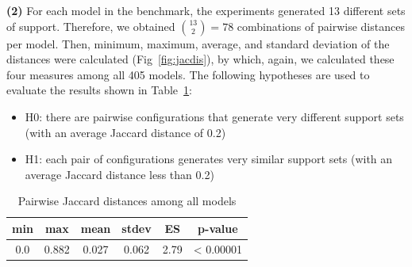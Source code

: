 \vspace{6pt}
\noindent{}
 \vspace{6pt}

\textbf{(2)} For each model in the benchmark, the experiments generated 13 different sets of support. Therefore, we obtained $\binom{13}{2} = 78$ combinations of pairwise distances per model. Then, minimum, maximum, average, and standard deviation of the distances were calculated (Fig~\ref{fig:jacdis}), by which, again, we calculated these four measures among all 405 models. The following hypotheses are used to evaluate the results shown in Table~\ref{tab:78com}:
\begin{itemize}
  \item H0: there are pairwise configurations that generate very different support sets (with an average Jaccard distance of 0.2)
  \item H1: each pair of configurations generates very similar support sets (with an average Jaccard distance less than 0.2)
\end{itemize}

\begin{table}
  \centering
  \begin{tabular}{ |c|c|c|c|c|c| }
    \hline
     min & max & mean & stdev & ES & p-value\\[0.5ex]
    \hline
     0.0   & 0.882 & 0.027 & 0.062 & 2.79 & < 0.00001 \\[0.5ex]
    \hline
  \end{tabular}
  \caption{Pairwise Jaccard distances among all models}
  \label{tab:78com}
\end{table}


